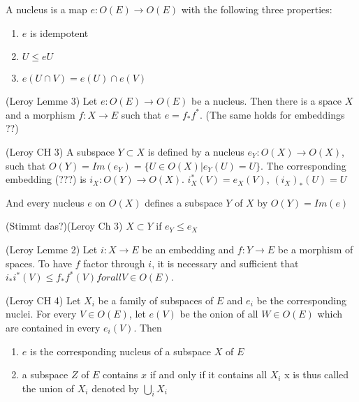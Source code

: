 \begin{definition}[Nucleus]
    \label{def:nucleus}
    \leanok
    A nucleus is a map $e : O(E) \rightarrow O(E)$ with the following three properties:
    \begin{enumerate}
        \item $e$ is idempotent
        \item $U \le e U$
        \item $e(U \cap V) = e(U) \cap e(V)$
    \end{enumerate}
\end{definition}

\begin{lemma}[Nucleus]
(Leroy Lemme 3)
    \label{lem:nucleus}
    Let $e : O(E) \rightarrow O(E)$ be a nucleus. Then there is a space $X$ and a morphism $f: X \rightarrow E$ such that $e = f_*f^*$. (The same holds for embeddings ??)
\end{lemma}

\begin{definition}[Subframe]
(Leroy CH 3)
    \label{lem:subframe}
    A subspace $Y \subset X$ is defined by a nucleus $e_Y: O(X) \rightarrow O(X)$, such that $O(Y) = Im(e_Y) = \{U \in O(X) | e_Y(U) = U\}$.
    The corresponding embedding (???) is $i_X : O(Y) \rightarrow O(X)$. $i^*_X(V) = e_X(V)$, $(i_X)_*(U) = U$

    And every nucleus $e$ on $O(X)$ defines a subspace $Y$ of $X$ by $O(Y) = Im(e)$
\end{definition}

\begin{definition}
(Stimmt das?)(Leroy Ch 3)
    \label{def:subframe_inclusion}
    $X \subset Y$ if $e_Y \le e_X$
\end{definition}

\begin{lemma}[factorisation]
(Leroy Lemme 2)
    \label{lem:factorisation}
    Let $i : X \rightarrow E$ be an embedding and $f: Y \rightarrow E$ be a morphism of spaces. To have $f$ factor through $i$, it is necessary and sufficient that $i_*i^*(V) \le f_*f^*(V) for all V \in O(E)$.
\end{lemma}


\begin{lemma}
(Leroy CH 4)
    \label{lem:family_of_subspaces}
    Let $X_i$ be a family of subspaces of $E$ and $e_i$ be the corresponding nuclei. For every $V \in O(E)$, let $e(V)$ be the onion of all $W \in O(E)$ which are contained in every $e_i(V)$. Then \\
    \begin{enumerate}
        \item $e$ is the corresponding nucleus of a subspace $X$ of $E$
        \item a subspace $Z$ of $E$ contains $x$ if and only if it contains all $X_i$ x is thus called the union of $X_i$ denoted by $\bigcup_i X_i$
    \end{enumerate}
\end{lemma}

